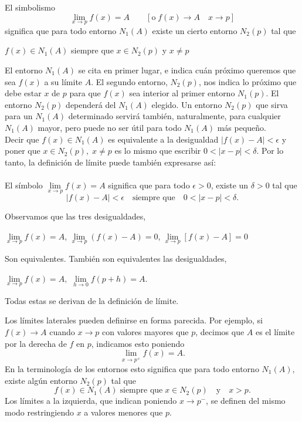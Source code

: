 \begin{tcolorbox}
    \begin{def.}
	El simbolismo $$\lim_{x\to p}f(x)=A\qquad [\mbox{o}\; {f(x)\to A}\quad {x\to p}]$$
	significa que para todo entorno $N_1(A)$ existe un cierto entorno $N_2(p)$ tal que 
	\begin{center}
	    $f(x)\in N_1(A)$ siempre que $x\in N_2(p)$ y $x\neq p$
	\end{center}
	\vspace{0.3cm}
	El entorno $N_1(A)$ se cita en primer lugar, e indica cuán próximo queremos que sea $f(x)$ a su límite $A$. El segundo entorno, $N_2(p)$, nos indica lo próximo que debe estar $x$ de $p$ para que $f(x)$ sea interior al primer entorno $N_1(p)$. El entorno $N_2(p)$ dependerá del $N_1(A)$ elegido. Un entorno $N_2(p)$ que sirva para un $N_1(A)$ determinado servirá también, naturalmente, para cualquier $N_1(A)$ mayor, pero puede no ser útil para todo $N_1(A)$ más pequeño.\\
	Decir que $f(x)\in N_1(A)$ es equivalente a la desigualdad $|f(x)-A|<\epsilon$ y poner que $x\in N_2(p),\; x\neq p$ es lo mismo que escribir $0<|x-p|<\delta$. Por lo tanto, la definición de límite puede también expresarse así:\\\\
	El símbolo $\lim\limits_{x\to p}f(x)=A$ significa que para todo $\epsilon > 0$, existe un $\delta >0$ tal que $$|f(x)-A|<\epsilon \quad \mbox{siempre que}\quad 0<|x-p|<\delta.$$
    \end{def.}
\end{tcolorbox}

Observamos que las tres desigualdades,

\begin{center}
    $\lim\limits_{x\to p}f(x)=A$, $\lim\limits_{x\to p}(f(x)-A)=0$, $\lim\limits_{x\to p}[f(x)-A]=0$
\end{center}

Son equivalentes. También son equivalentes las desigualdades,

\begin{center}
    $\lim\limits_{x\to p} f(x)=A,$ $\lim\limits_{h\to 0}f(p+h)=A.$
\end{center}

Todas estas se derivan de la definición de límite.\\

    \begin{def.}
	Los límites laterales pueden definirse en forma parecida. Por ejemplo, si ${f(x)\to A}$ cuando ${x\to p}$ con valores mayores que $p$, decimos que $A$ es el límite por la derecha de $f$ en $p$, indicamos esto poniendo
	$$\lim_{x\to p^+}f(x)=A.$$
	En la terminología de los entornos esto significa que para todo entorno $N_1(A),$ existe algún entorno $N_2(p)$ tal que 
	$$f(x)\in N_1(A)\; \mbox{siempre que}\; x \in N_2(p)\quad \mbox{y}\quad x>p.$$
	Los límites a la izquierda, que indican poniendo ${x\to p^-}$, se definen del mismo modo restringiendo $x$ a valores menores que $p$.
    \end{def.}

